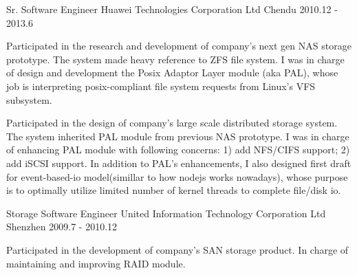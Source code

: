 \begin{cventries}
  \cventry
    {Sr. Software Engineer} %
    {Huawei Technologies Corporation Ltd} %
    {Chendu} %
    {2010.12 - 2013.6} %
    {
      \begin{cvitems} %
        \item {Participated in the research and development of company's next gen NAS storage prototype. The system made heavy reference to ZFS file system. I was in charge of design and development the Posix Adaptor Layer module (aka PAL), whose job is interpreting posix-compliant file system requests from Linux's VFS subsystem.}
        \item {Participated in the design of company's large scale distributed storage system. The system inherited PAL module from previous NAS prototype. I was in charge of enhancing PAL module with following concerns: 1) add NFS/CIFS support; 2) add iSCSI support. In addition to PAL's enhancements, I also designed first draft for event-based-io model(simillar to how nodejs works nowadays), whose purpose is to optimally utilize limited number of kernel threads to complete file/disk io.}
      \end{cvitems}
    }


  \cventry
    {Storage Software Engineer} %
    {United Information Technology Corporation Ltd} %
    {Shenzhen} %
    {2009.7 - 2010.12} %
    {
      \begin{cvitems} %
        \item {Participated in the development of company's SAN storage product. In charge of maintaining and improving RAID module.}
      \end{cvitems}
    }


\end{cventries}
